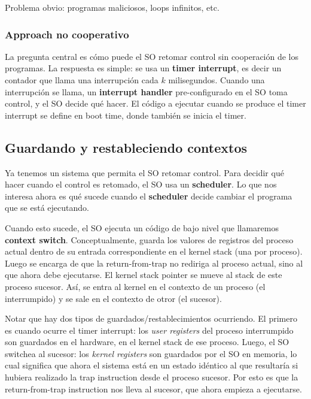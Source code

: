 \documentclass[12pt]{article}
\theoremstyle{definition}
\begin{document}
Problema obvio: programas maliciosos, loops infinitos, etc.

\subsubsection{Approach no cooperativo}

La pregunta central es cómo puede el SO retomar control sin cooperación de los
programas. La respuesta es simple: se usa un \textbf{timer interrupt}, es decir
un contador que llama una interrupción cada $k$ milisegundos. Cuando una
interrupción se llama, un \textbf{interrupt handler} pre-configurado en el SO
toma control, y el SO decide qué hacer. El código a ejecutar cuando se produce
el timer interrupt se define en boot time, donde también se inicia el timer.

\subsection{Guardando y restableciendo contextos}

Ya tenemos un sistema que permita el SO retomar control. Para decidir qué hacer
cuando el control es retomado, el SO usa un \textbf{scheduler}. Lo que nos
interesa ahora es qué sucede cuando el \textbf{scheduler} decide cambiar el
programa que se está ejecutando. 

Cuando esto sucede, el SO ejecuta un código de bajo nivel que llamaremos
\textbf{context switch}. Conceptualmente, guarda los valores de registros del
proceso actual dentro de su entrada correspondiente en el kernel stack (una por
proceso). Luego se encarga de que la return-from-trap no rediriga al proceso
actual, sino al que ahora debe ejecutarse. El kernel stack pointer se mueve al
stack de este proceso sucesor. Así, se entra al kernel en el contexto de un
proceso (el interrumpido) y se sale en el contexto de otror (el sucesor).

Notar que hay dos tipos de guardados/restablecimientos ocurriendo. El primero es
cuando ocurre el timer interrupt: los \textit{user registers} del proceso
interrumpido son guardados en el hardware, en el kernel stack de ese proceso.
Luego, el SO switchea al sucesor: los \textit{kernel registers} son guardados
por el SO en memoria, lo cual significa que ahora el sistema está en un estado
idéntico al que resultaría si hubiera realizado la trap instruction desde el
proceso sucesor. Por esto es que la return-from-trap instruction nos lleva al
sucesor, que ahora empieza a ejecutarse.
\end{document}
